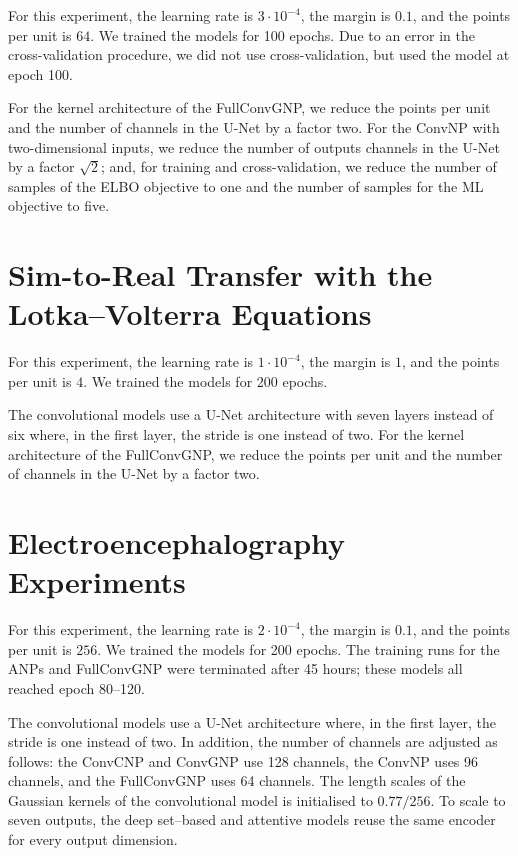 \documentclass[12pt]{report}
\begin{document}
For this experiment,
the learning rate is $3\cdot10^{-4}$,
the margin is $0.1$,
and the points per unit is $64$.
We trained the models for 100 epochs.
Due to an error in the cross-validation procedure, we did not use cross-validation, but used the model at epoch 100.

For the kernel architecture of the FullConvGNP, we reduce the points per unit and the number of channels in the U-Net by a factor two.
For the ConvNP with two-dimensional inputs, we reduce the number of outputs channels in the U-Net by a factor $\sqrt{2}$; and, for training and cross-validation, we reduce the number of samples of the ELBO objective to one and the number of samples for the ML objective to five.

\section{Sim-to-Real Transfer with the Lotka--Volterra Equations}
\label{sec:experimental_details:predprey}

For this experiment,
the learning rate is $1\cdot10^{-4}$,
the margin is $1$,
and the points per unit is $4$.
We trained the models for 200 epochs.

The convolutional models use a U-Net architecture with seven layers instead of six
where, in the first layer, the stride is one instead of two.
For the kernel architecture of the FullConvGNP, we reduce the points per unit and the number of channels in the U-Net by a factor two.

\section{Electroencephalography Experiments}
\label{sec:experimental_details:eeg}

For this experiment,
the learning rate is $2\cdot10^{-4}$,
the margin is $0.1$,
and the points per unit is $256$.
We trained the models for 200 epochs.
The training runs for the ANPs and FullConvGNP were terminated after 45 hours;
these models all reached epoch 80--120.

The convolutional models use a U-Net architecture where, in the first layer, the stride is one instead of two.
In addition, the number of channels are adjusted as follows:
the ConvCNP and ConvGNP use 128 channels, the ConvNP uses 96 channels, and the FullConvGNP uses 64 channels.
The length scales of the Gaussian kernels of the convolutional model is initialised to $0.77 / 256$.
To scale to seven outputs, the deep set--based and attentive models reuse the same encoder for every output dimension.
\end{document}
